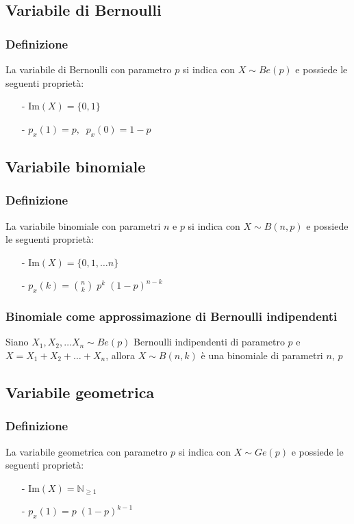 \documentclass[a4paper]{article}
\begin{document}
\subsection{Variabile di Bernoulli}
\subsubsection*{Definizione}
La variabile di Bernoulli con parametro \(p\) si indica con \(X \sim Be(p)\) e possiede le seguenti proprietà:
\begin{itemize}[topsep=3pt, itemsep=0pt]
	\item[-] \(\text{Im}(X) = \{0,1\}\)
	\item[-] \(p_x(1) = p, \;\; p_x(0) = 1-p\)
\end{itemize}

\subsection{Variabile binomiale}
\subsubsection*{Definizione}
La variabile binomiale con parametri \(n\) e \(p\) si indica con \(X \sim B(n,p)\) e possiede le seguenti proprietà:
\begin{itemize}[topsep=3pt, itemsep=0pt]
	\item[-] \(\text{Im}(X) = \{0,1,\dots n\}\)
	\item[-] \(\displaystyle p_x(k) = \binom{n}{k} \; p^{k} \; (1-p)^{n-k}\)
\end{itemize}

\subsubsection*{Binomiale come approssimazione di Bernoulli indipendenti}
Siano \(X_1, X_2, \dots X_n \sim Be(p)\) Bernoulli indipendenti di parametro \(p\) e \(X = X_1 + X_2 + \dots + X_n\), allora
\(X \sim B(n,k)\) è una binomiale di parametri \(n\), \(p\)

\subsection{Variabile geometrica}
\subsubsection*{Definizione}
La variabile geometrica con parametro \(p\) si indica con \(X \sim Ge(p)\) e possiede le seguenti proprietà:
\begin{itemize}[topsep=3pt, itemsep=0pt]
	\item[-] \(\text{Im}(X) = \mathbb{N}_{\geq 1}\)
	\item[-] \(p_x(1) = p \; (1-p)^{k-1}\)
\end{itemize}
\end{document}
